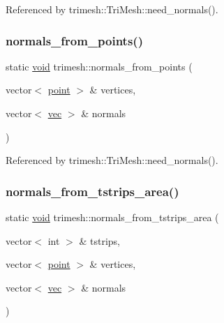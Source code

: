Referenced by trimesh\+::\+Tri\+Mesh\+::need\+\_\+normals().

\mbox{\label{namespacetrimesh_a85064c56f0561f54362cff887a77bd63}} 
\subsubsection{\texorpdfstring{normals\+\_\+from\+\_\+points()}{normals\_from\_points()}}
{\footnotesize\ttfamily static \hyperlink{namespacetrimesh_a784ddfd979e1c579bda795a8edfc3f43}{void} trimesh\+::normals\+\_\+from\+\_\+points (\begin{DoxyParamCaption}\item[{vector$<$ \hyperlink{namespacetrimesh_a325b99fd6454b22fa4c4bc3223271b2c}{point} $>$ \&}]{vertices,  }\item[{vector$<$ \hyperlink{namespacetrimesh_a4fc2b83feba99c931f837a0c7d4b4df1}{vec} $>$ \&}]{normals }\end{DoxyParamCaption})\hspace{0.3cm}{\ttfamily [static]}}



Referenced by trimesh\+::\+Tri\+Mesh\+::need\+\_\+normals().

\mbox{\label{namespacetrimesh_a80dff89e7d68e0131963211753ae0e4a}} 
\subsubsection{\texorpdfstring{normals\+\_\+from\+\_\+tstrips\+\_\+area()}{normals\_from\_tstrips\_area()}}
{\footnotesize\ttfamily static \hyperlink{namespacetrimesh_a784ddfd979e1c579bda795a8edfc3f43}{void} trimesh\+::normals\+\_\+from\+\_\+tstrips\+\_\+area (\begin{DoxyParamCaption}\item[{vector$<$ int $>$ \&}]{tstrips,  }\item[{vector$<$ \hyperlink{namespacetrimesh_a325b99fd6454b22fa4c4bc3223271b2c}{point} $>$ \&}]{vertices,  }\item[{vector$<$ \hyperlink{namespacetrimesh_a4fc2b83feba99c931f837a0c7d4b4df1}{vec} $>$ \&}]{normals }\end{DoxyParamCaption})\hspace{0.3cm}{\ttfamily [static]}}



